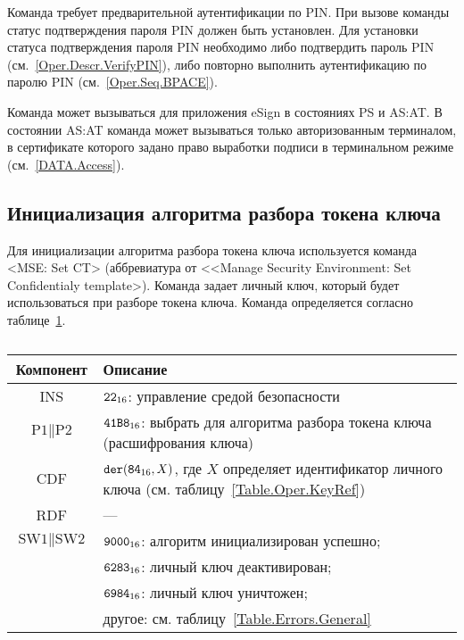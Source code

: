 Команда требует предварительной аутентификации по PIN. 
При вызове команды статус подтверждения 
пароля PIN должен быть установлен.
Для установки статуса подтверждения пароля PIN 
необходимо либо подтвердить пароль PIN (см.~\ref{Oper.Descr.VerifyPIN}), 
либо повторно выполнить аутентификацию по паролю PIN (см.~\ref{Oper.Seq.BPACE}).

Команда может вызываться для приложения eSign в 
состояниях PS и AS:AT. В состоянии AS:AT команда 
может вызываться только авторизованным терминалом,
в сертификате которого задано право 
выработки подписи в терминальном режиме (см.~\ref{DATA.Access}).


\subsection{Инициализация алгоритма разбора токена ключа}
\label{Oper.Descr.SetCT}

Для инициализации алгоритма разбора токена ключа
используется команда <MSE: Set CT> 
(аббревиатура от <<Manage Security Environment: Set Confidentialy template>).
Команда задает личный ключ, который будет использоваться при разборе токена ключа.
Команда определяется согласно таблице~\ref{Table.Oper.SetCTCmd}.

\begin{table}[hbt]
\caption{}\label{Table.Oper.SetCTCmd}
\begin{tabular}{|c|p{14cm}|}
\hline
Компонент & Описание \\
\hline
\hline
INS & $\texttt{22}_{16}$: управление средой безопасности\\ 
\hline
$\text{P1} \parallel\text{P2}$ & $\texttt{41B8}_{16}$: 
выбрать для алгоритма разбора токена ключа
(расшифрования ключа) \\
\hline
CDF & 
$\texttt{der}(\texttt{84}_{16}, X)$, 
где $X$ определяет идентификатор личного ключа
(см. таблицу~\ref{Table.Oper.KeyRef})\\
\hline
RDF &  --- \\
\hline
$\text{SW1} \parallel \text{SW2}$ & 
$\texttt{9000}_{16}$: алгоритм инициализирован успешно; \\
  & $\texttt{6283}_{16}$: личный ключ деактивирован; \\
  & $\texttt{6984}_{16}$: личный ключ уничтожен; \\
  & другое: см. таблицу~\ref{Table.Errors.General} \\
\hline
\end{tabular}
\end{table}

